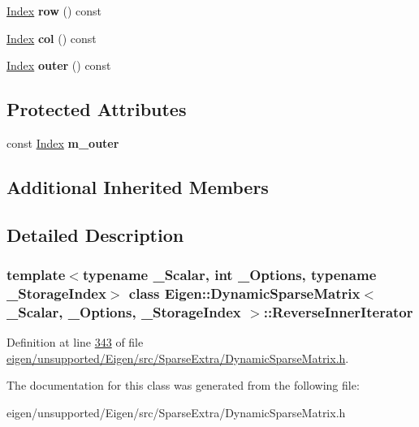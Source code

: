 \begin{DoxyCompactItemize}
\hyperlink{group___core___module_a554f30542cc2316add4b1ea0a492ff02}{Index} {\bfseries row} () const
\item 
\mbox{\label{class_eigen_1_1_dynamic_sparse_matrix_1_1_reverse_inner_iterator_ae0ab3fae420519d7d466498803de8826}} 
\hyperlink{group___core___module_a554f30542cc2316add4b1ea0a492ff02}{Index} {\bfseries col} () const
\item 
\mbox{\label{class_eigen_1_1_dynamic_sparse_matrix_1_1_reverse_inner_iterator_adf271c799573f3dc98584b0423206f76}} 
\hyperlink{group___core___module_a554f30542cc2316add4b1ea0a492ff02}{Index} {\bfseries outer} () const
\end{DoxyCompactItemize}
\subsection*{Protected Attributes}
\begin{DoxyCompactItemize}
\item 
\mbox{\label{class_eigen_1_1_dynamic_sparse_matrix_1_1_reverse_inner_iterator_a4115d1f0f34aad6183fc382ffffcf096}} 
const \hyperlink{group___core___module_a554f30542cc2316add4b1ea0a492ff02}{Index} {\bfseries m\+\_\+outer}
\end{DoxyCompactItemize}
\subsection*{Additional Inherited Members}


\subsection{Detailed Description}
\subsubsection*{template$<$typename \+\_\+\+Scalar, int \+\_\+\+Options, typename \+\_\+\+Storage\+Index$>$\newline
class Eigen\+::\+Dynamic\+Sparse\+Matrix$<$ \+\_\+\+Scalar, \+\_\+\+Options, \+\_\+\+Storage\+Index $>$\+::\+Reverse\+Inner\+Iterator}



Definition at line \hyperlink{eigen_2unsupported_2_eigen_2src_2_sparse_extra_2_dynamic_sparse_matrix_8h_source_l00343}{343} of file \hyperlink{eigen_2unsupported_2_eigen_2src_2_sparse_extra_2_dynamic_sparse_matrix_8h_source}{eigen/unsupported/\+Eigen/src/\+Sparse\+Extra/\+Dynamic\+Sparse\+Matrix.\+h}.



The documentation for this class was generated from the following file\+:\begin{DoxyCompactItemize}
\item 
eigen/unsupported/\+Eigen/src/\+Sparse\+Extra/\+Dynamic\+Sparse\+Matrix.\+h\end{DoxyCompactItemize}
